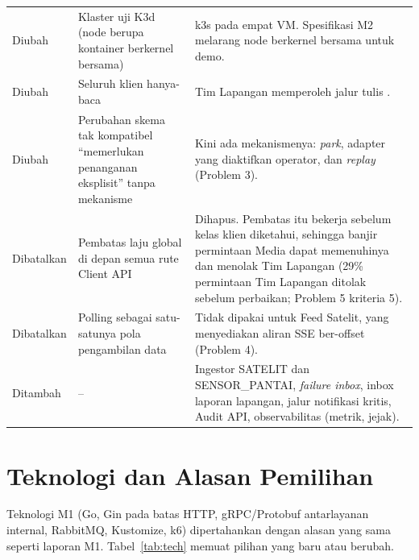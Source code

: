 \documentclass{fairmeta}
\newcommand{\code}[1]{\texttt{\detokenize{#1}}}
\begin{document}
{\begin{longtable}{@{}L{1.9cm}L{4.6cm}L{8.9cm}@{}}
Diubah & Klaster uji K3d (node berupa kontainer berkernel bersama) & k3s pada empat VM. Spesifikasi M2 melarang node berkernel bersama untuk demo.\\
Diubah & Seluruh klien hanya-baca & Tim Lapangan memperoleh jalur tulis \code{POST /field-reports}.\\
Diubah & Perubahan skema tak kompatibel ``memerlukan penanganan eksplisit'' tanpa mekanisme & Kini ada mekanismenya: \textit{park}, adapter yang diaktifkan operator, dan \textit{replay} (Problem 3).\\
Dibatalkan & Pembatas laju global di depan semua rute Client API & Dihapus. Pembatas itu bekerja sebelum kelas klien diketahui, sehingga banjir permintaan Media dapat memenuhinya dan menolak Tim Lapangan (29\% permintaan Tim Lapangan ditolak sebelum perbaikan; Problem 5 kriteria 5).\\
Dibatalkan & Polling sebagai satu-satunya pola pengambilan data & Tidak dipakai untuk Feed Satelit, yang menyediakan aliran SSE ber-offset (Problem 4).\\
Ditambah & -- & Ingestor SATELIT dan SENSOR\_PANTAI, \textit{failure inbox}, inbox laporan lapangan, jalur notifikasi kritis, Audit API, observabilitas (metrik, jejak).\\
\end{longtable}
}

\section{Teknologi dan Alasan Pemilihan}

Teknologi M1 (Go, Gin pada batas HTTP, gRPC/Protobuf antarlayanan internal, RabbitMQ, Kustomize, k6) dipertahankan dengan alasan yang sama seperti laporan M1. Tabel~\ref{tab:tech} memuat pilihan yang baru atau berubah.
\end{document}

